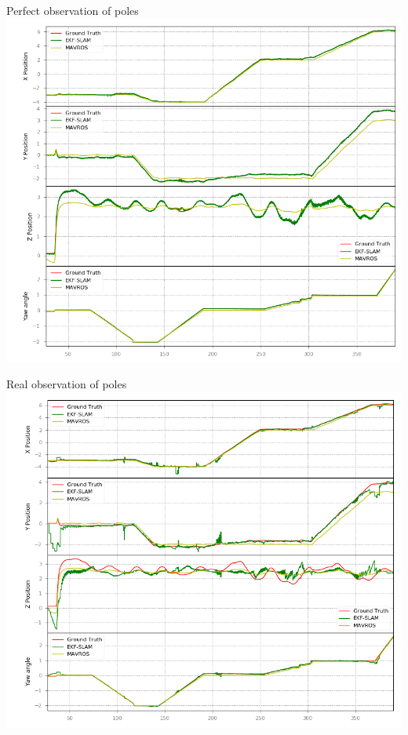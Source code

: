 \documentclass[serif]{beamer}
\begin{document}
    \begin{frame}[nonumber]{Perfect observation of poles}
        \centering
        \includegraphics[width=0.7\linewidth]{Images/fig20-exp-a1.png}
    \end{frame}

    \begin{frame}[nonumber]{Real observation of poles}
        \centering
        \includegraphics[width=0.7\linewidth]{Images/fig20-exp-a2.png}
    \end{frame}
\end{document}
